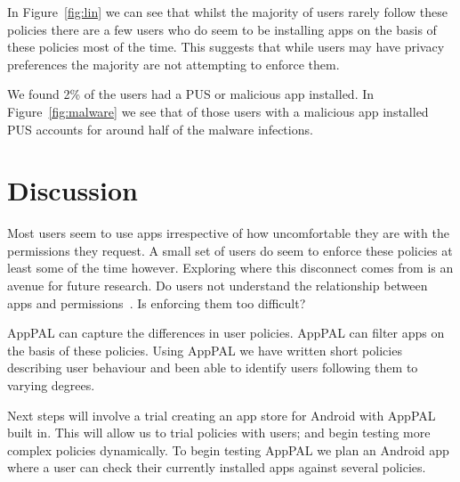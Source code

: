 \documentclass[]{soups-poster}
\newcommand{\citep}[1]{\cite{#1}}
\begin{document}
In Figure~\ref{fig:lin} we can see that whilst the majority of users rarely
follow these policies there are a few users who do seem to be installing apps on
the basis of these policies most of the time.
This suggests that while users may have privacy preferences the majority are not attempting to enforce them.

We found 2\% of the users had a PUS or malicious app installed.
In Figure~\ref{fig:malware} we see that of those users with a malicious app
installed PUS accounts for around half of the malware infections.

\section{Discussion}

Most users seem to use apps irrespective of how uncomfortable they are with the permissions they request.
A small set of users do seem to enforce these policies at least some of the time however.
Exploring where this disconnect comes from is an avenue for future research.
Do users not understand the relationship between apps and permissions~\citep{Felt:2012hma}.
Is enforcing them too difficult?


AppPAL can capture the differences in user policies.
AppPAL can filter apps on the basis of these policies.  
Using AppPAL we have written short policies describing user behaviour and been able to identify users following them to varying degrees.

Next steps will involve a trial creating an app store for Android with AppPAL
built in.  This will allow us to trial policies with users; and begin testing
more complex policies dynamically.  To begin testing AppPAL we plan an Android
app where a user can check their currently installed apps against several
policies.



\end{document}
